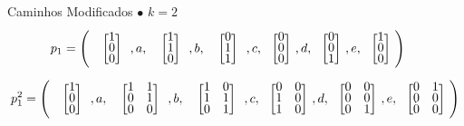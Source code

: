 \begin{frame}{Caminhos Modificados}
  \setlength\arraycolsep{2pt}
 $\bullet$ $k=2$
 \small
 \begin{align*}
   p_1&= \left(\tikz[baseline]{
            \node[anchor=base] (n1)
            {$\colvec{1\\0\\0}$};
        },a,\tikz[baseline]{
            \node[anchor=base] (n2)
            {$\colvec{1\\1\\0}$};
        },b,\tikz[baseline]{
            \node[anchor=base] (n3)
            {$\colvec{0\\1\\1}$};
        },c,\colvec{0\\0\\0},d,\colvec{0\\0\\1},e,\colvec{1\\0\\0}\right)
   \tikz[baseline] \node[coordinate] (baba) {};
\end{align*}
 \begin{align*}
  p_1^2&= \left(\tikz[baseline]{
            \node[anchor=base] (t1)
            {$\colvec{1\\0\\0}$};
        },a,\tikz[baseline]{
            \node[anchor=base] (t2)
            {$\colvec{1&1\\0&1\\0&0}$};
        },b,\tikz[baseline]{
            \node[anchor=base] (t3)
            {$\colvec{1&0\\1&1\\0&1}$};
        },c,\colvec{0&0\\1&0\\1&0},d,\colvec{0&0\\0&0\\0&1},e,\colvec{0&1\\0&0\\0&0}\right) \\ 
 \end{align*}
\end{frame}


